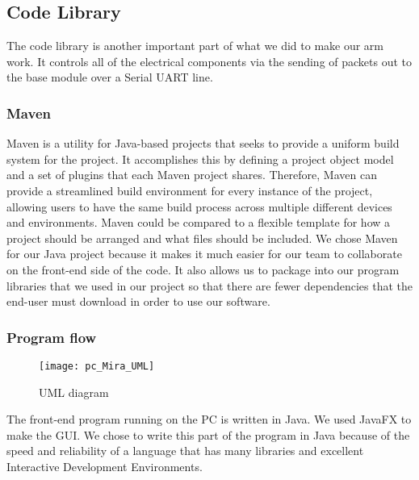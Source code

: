 \subsection{Code Library}
The code library is another important part of what we did to make our arm work. It controls all of the electrical components via the sending of packets out to the base module over a Serial UART line. 

\subsubsection{Maven}
Maven is a utility for Java-based projects that seeks to provide a uniform build system for the project. It accomplishes this by defining a project object model and a set of plugins that each Maven project shares. Therefore, Maven can provide a streamlined build environment for every instance of the project, allowing users to have the same build process across multiple different devices and environments. Maven could be compared to a flexible template for how a project should be arranged and what files should be included. We chose Maven for our Java project because it makes it much easier for our team to collaborate on the front-end side of the code.  It also allows us to package into our program libraries that we used in our project so that there are fewer dependencies that the end-user must download in order to use our software.

\subsubsection{Program flow}


\begin{figure}[H]
\centering
\texttt{[image: pc\_Mira\_UML]}
\caption{UML diagram}
\label{fig:Functional_Block_Diagram}
\end{figure}

\noindent The front-end program running on the PC is written in Java. We used JavaFX to make the GUI. We chose to write this part of the program in Java because of the speed and reliability of a language that has many libraries and excellent Interactive Development Environments.  

